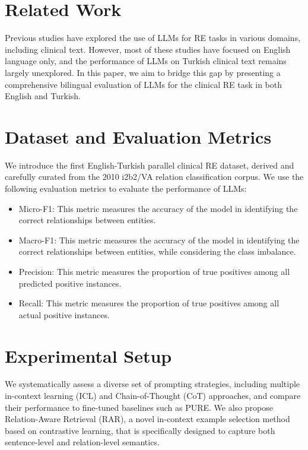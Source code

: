 \documentclass{article}
\begin{document}
\section{Related Work}
Previous studies have explored the use of LLMs for RE tasks in various domains, including clinical text. However, most of these studies have focused on English language only, and the performance of LLMs on Turkish clinical text remains largely unexplored. In this paper, we aim to bridge this gap by presenting a comprehensive bilingual evaluation of LLMs for the clinical RE task in both English and Turkish.

\section{Dataset and Evaluation Metrics}
We introduce the first English-Turkish parallel clinical RE dataset, derived and carefully curated from the 2010 i2b2/VA relation classification corpus. We use the following evaluation metrics to evaluate the performance of LLMs:

\begin{itemize}
\item Micro-F1: This metric measures the accuracy of the model in identifying the correct relationships between entities.
\item Macro-F1: This metric measures the accuracy of the model in identifying the correct relationships between entities, while considering the class imbalance.
\item Precision: This metric measures the proportion of true positives among all predicted positive instances.
\item Recall: This metric measures the proportion of true positives among all actual positive instances.
\end{itemize}

\section{Experimental Setup}
We systematically assess a diverse set of prompting strategies, including multiple in-context learning (ICL) and Chain-of-Thought (CoT) approaches, and compare their performance to fine-tuned baselines such as PURE. We also propose Relation-Aware Retrieval (RAR), a novel in-context example selection method based on contrastive learning, that is specifically designed to capture both sentence-level and relation-level semantics.
\end{document}

